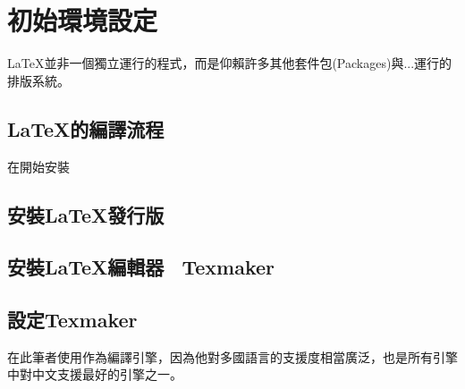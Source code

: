 \documentclass{../indiv}
\begin{document}
	\chapter{初始環境設定}
	\LaTeX 並非一個獨立運行的程式，而是仰賴許多其他套件包(Packages)與...運行的排版系統。
	\section{\LaTeX 的編譯流程}
	在開始安裝
	\section{安裝\LaTeX 發行版 \textemdash\ }
	
	\section{安裝\LaTeX 編輯器 \textemdash\ Texmaker}
	
	\section{設定Texmaker}
	在此筆者使用作為編譯引擎，因為他對多國語言的支援度相當廣泛，也是所有引擎中對中文支援最好的引擎之一。
\end{document}
